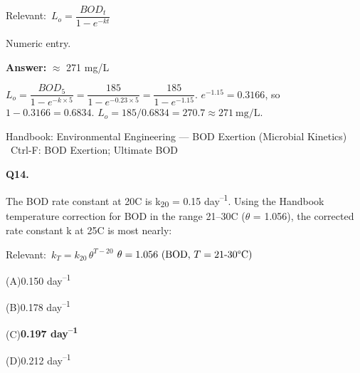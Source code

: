\documentclass[11pt]{article}
\newcommand{\correct}[1]{\textbf{#1}\;{\color{accent}$\checkmark$}}
\newcommand{\optline}[2]{\par\noindent\hspace{1.2em}(#1)\hspace{0.6em}#2}
\begin{document}
{\small\color{soft}Relevant:}\ $L_o = \dfrac{BOD_t}{1 - e^{-kt}}$\par\vspace{3pt}
{\small\color{soft}Numeric entry.}\par\vspace{3pt}
\vspace{2pt}\par\noindent\colorbox{boxbg}{\parbox{\dimexpr\linewidth-2\fboxsep\relax}{%
\vspace{2pt}\textbf{Answer:} $\approx$ 271 mg/L\par\vspace{2pt}
{\small $L_o = \dfrac{BOD_5}{1-e^{-k\times5}} = \dfrac{185}{1-e^{-0.23\times5}} = \dfrac{185}{1-e^{-1.15}}$.  $e^{-1.15} = 0.3166$, so $1-0.3166 = 0.6834$.  $L_o = 185/0.6834 = 270.7\approx 271\ \mathrm{mg/L}$.}\par\vspace{2pt}
{\footnotesize\color{soft}Handbook: Environmental Engineering --- BOD Exertion (Microbial Kinetics) \textbullet\ Ctrl-F: BOD Exertion; Ultimate BOD}\vspace{2pt}
}}
\vspace{9pt}
\filbreak
\textbf{\color{accent}Q14.}\par\vspace{2pt}
The BOD rate constant at 20\textdegree{}C is k\textsubscript{2}\textsubscript{0} = 0.15 day\textsuperscript{--}\textsuperscript{1}. Using the Handbook temperature correction for BOD in the range 21--30\textdegree{}C ($\theta$ = 1.056), the corrected rate constant k at 25\textdegree{}C is most nearly:\par\vspace{3pt}
{\small\color{soft}Relevant:}\ $k_T = k_{20}\,\theta^{T-20}$ \quad $\theta = 1.056\ (\text{BOD, }T = 21\text{-30\textdegree C})$\par\vspace{3pt}
\optline{A}{0.150 day\textsuperscript{--}\textsuperscript{1}}
\optline{B}{0.178 day\textsuperscript{--}\textsuperscript{1}}
\optline{C}{\correct{0.197 day\textsuperscript{--}\textsuperscript{1}}}
\optline{D}{0.212 day\textsuperscript{--}\textsuperscript{1}}
\par\vspace{3pt}
\end{document}
